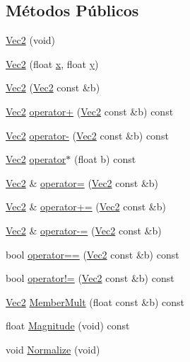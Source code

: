 \subsection*{Métodos Públicos}
\begin{DoxyCompactItemize}
\item 
\hyperlink{classVec2_a4e240b8f078ee238e6be681c8d34d759}{Vec2} (void)
\item 
\hyperlink{classVec2_a6256fecebf5a43b14d5d5341c58cfdc4}{Vec2} (float \hyperlink{classVec2_adf8ee322d4b4bcc04146762c018d731f}{x}, float \hyperlink{classVec2_a30543787e62f6d915543cf1dfb04c094}{y})
\item 
\hyperlink{classVec2_ad8309ba4db7467af8c8934e5e0d5751a}{Vec2} (\hyperlink{classVec2}{Vec2} const \&b)
\item 
\hyperlink{classVec2}{Vec2} \hyperlink{classVec2_ac7d3e5daad85a1883eeabb5f6f37fa2c}{operator+} (\hyperlink{classVec2}{Vec2} const \&b) const 
\item 
\hyperlink{classVec2}{Vec2} \hyperlink{classVec2_a5943a96d245b622f13849906296872e8}{operator-\/} (\hyperlink{classVec2}{Vec2} const \&b) const 
\item 
\hyperlink{classVec2}{Vec2} \hyperlink{classVec2_ab8024729f0ff93341ef1826ab264c278}{operator$\ast$} (float b) const 
\item 
\hyperlink{classVec2}{Vec2} \& \hyperlink{classVec2_a5f11bf2c956c09d90d515bbbf46337ec}{operator=} (\hyperlink{classVec2}{Vec2} const \&b)
\item 
\hyperlink{classVec2}{Vec2} \& \hyperlink{classVec2_ae7aa55c56ed024029ee6f450b014dcee}{operator+=} (\hyperlink{classVec2}{Vec2} const \&b)
\item 
\hyperlink{classVec2}{Vec2} \& \hyperlink{classVec2_a04202314b5513694ea805e43bdd754f6}{operator-\/=} (\hyperlink{classVec2}{Vec2} const \&b)
\item 
bool \hyperlink{classVec2_a01d41260f16f9be282347f50f621224b}{operator==} (\hyperlink{classVec2}{Vec2} const \&b) const 
\item 
bool \hyperlink{classVec2_a34b74d6e6cb70aea725c5dc27310eb4a}{operator!=} (\hyperlink{classVec2}{Vec2} const \&b) const 
\item 
\hyperlink{classVec2}{Vec2} \hyperlink{classVec2_a0af80a4efc933b61b2885a815a15a77f}{Member\+Mult} (float const \&b) const 
\item 
float \hyperlink{classVec2_af904886a3658709196f6b171b517f593}{Magnitude} (void) const 
\item 
void \hyperlink{classVec2_ab37a161e393133ba7083d3f9386c0173}{Normalize} (void)

\end{DoxyCompactItemize}
